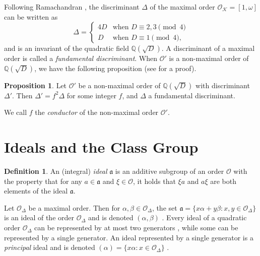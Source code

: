 \documentclass{ucalgthes1}
\theoremstyle{definition}
\newtheorem{prop}[thm]{Proposition}
\newtheorem{defn}[thm]{Definition}
\newcommand{\ZZ}{\mathbb{Z}}
\newcommand{\QQ}{\mathbb{Q}}
\newcommand{\KK}{\mathcal{K}}
\newcommand{\OO}{\mathcal{O}}
\newcommand{\ideal}{\mathfrak}
\begin{document}
Following Ramachandran \cite[p.13]{Ramachandran2006}, the discriminant $\Delta$ of the maximal order $\OO_\KK = [1, \omega]$ can be written as
\[
\Delta = \begin{cases}
	4D & \textrm{when } D \equiv 2, 3 \pmod 4 \\
	D  & \textrm{when } D \equiv 1 \pmod 4,
\end{cases}
\]
and is an invariant of the quadratic field $\QQ(\sqrt D)$.  A discriminant of a maximal order is called a \emph{fundamental discriminant}.  When $\OO'$ is a non-maximal order of $\QQ(\sqrt D)$, we have the following proposition (see \cite[p.216]{Cohn1980} for a proof).

\begin{prop}
Let $\OO'$ be a non-maximal order of $\QQ(\sqrt D)$ with discriminant $\Delta'$.  Then $\Delta' = f^2 \Delta$ for some integer $f$, and $\Delta$ a fundamental discriminant.
\end{prop}

\noindent
We call $f$ the \emph{conductor} of the non-maximal order $\OO'$.


\section{Ideals and the Class Group}
\label{sec:classGroup}

\begin{defn}
An (integral) \emph{ideal} $\mathfrak a$ is an additive subgroup of an order $\OO$ with the property that for any $a \in \mathfrak a$ and $\xi \in \OO$, it holds that $\xi a$ and $a \xi$ are both elements of the ideal $\mathfrak a$.
\end{defn}


Let $\OO_\Delta$ be a maximal order.  Then for $\alpha, \beta \in \OO_\Delta$, the set $\ideal a = \{x \alpha + y \beta : x, y \in \OO_\Delta\}$ is an ideal of the order $\OO_\Delta$ and is denoted $(\alpha, \beta)$ \cite[p.16]{Ramachandran2006}.  Every ideal of a quadratic order $\OO_\Delta$ can be represented by at most two generators \cite[p.125--126]{Cohn1980}, while some can be represented by a single generator.  An ideal represented by a single generator is a \emph{principal} ideal and is denoted $(\alpha) = \{ x \alpha : x \in \OO_\Delta \}$ \cite[p.87]{Jacobson2009}.
\end{document}
